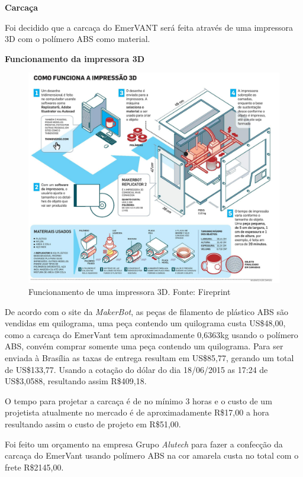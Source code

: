\pagebreak
\indent \textbf{Carcaça}

Foi decidido que a carcaça do EmerVANT será feita através de uma impressora 3D
com o polímero ABS como material.

\indent \indent \textbf{Funcionamento da impressora 3D}

\begin{figure}[H]
    \centering
      \includegraphics[keepaspectratio=true,scale=0.25]{figuras/impressao3D.jpg}
    \caption{Funcionamento de uma impressora 3D. Fonte: Fireprint\protect\footnotemark}
    \label{fig:impressao3D}
\end{figure}

De acordo com o site da \textit{MakerBot}\footnotemark, as peças de filamento de plástico ABS são vendidas em quilograma, uma peça contendo um quilograma custa US\$48,00, como a carcaça do EmerVant tem aproximadamente 0,6363kg usando o polímero ABS, convém comprar somente uma  peça contendo um quilograma. Para ser enviada à Brasília as taxas de entrega resultam em US\$85,77, gerando um total de US\$133,77. Usando a cotação do dólar do dia 18/06/2015 as 17:24 de US\$3,0588, resultando assim R\$409,18.

O tempo para projetar a carcaça é de no mínimo 3 horas e o custo de um projetista atualmente no mercado é de aproximadamente R\$17,00 a hora resultando assim o custo de projeto em R\$51,00.

Foi feito um orçamento na empresa Grupo \textit{Alutech} para fazer a confecção da carcaça do EmerVant usando polímero ABS na cor amarela custa no total com o frete R\$2145,00.


